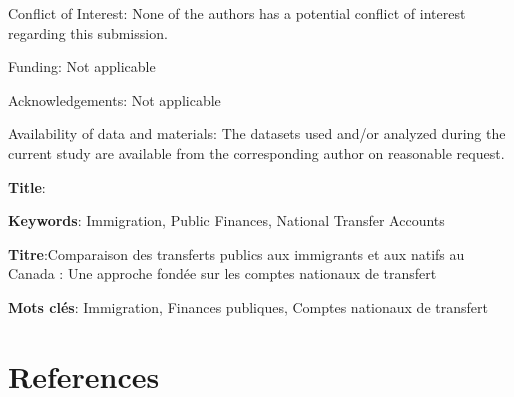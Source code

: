 \documentclass[12pt,a4paper]{article}
\begin{document}
\begin{titlepage}
  \vspace{0.7em}\par
  \noindent
  Conflict of Interest: None of the authors has a potential conflict of interest regarding this submission.

  \vspace{0.7em}\par
  \noindent
  Funding: Not applicable

  \vspace{0.7em}\par
  \noindent
  Acknowledgements: Not applicable

  \vspace{0.7em}\par
  \noindent
  Availability of data and materials: The datasets used and/or analyzed during the current study are available from the
  corresponding author on reasonable request.


\end{titlepage}



\newpage
\setcounter{page}{1}
\captionsetup[table]{skip=0pt}
\textbf{Title}: \articleTwoTitle

\vspace{0.7em}\par
\textbf{Keywords}: Immigration, Public Finances, National Transfer Accounts

  \vspace{0.7em}\par
  \vspace{0.7em}\par
  \vspace{0.7em}\par

  \textbf{Titre}:Comparaison des transferts publics aux immigrants et aux natifs au Canada : Une approche fondée sur les comptes nationaux de transfert
  \vspace{0.7em}\par
  \textbf{Mots clés}: Immigration, Finances publiques, Comptes nationaux de transfert

  \vspace{0.7em}\par
  \vspace{0.7em}\par
  \vspace{0.7em}\par

\onehalfspacing

\newpage
\begin{abstract}
  
\end{abstract}

\newpage



\section*{References}
\printbibliography[heading=none]
\end{document}
